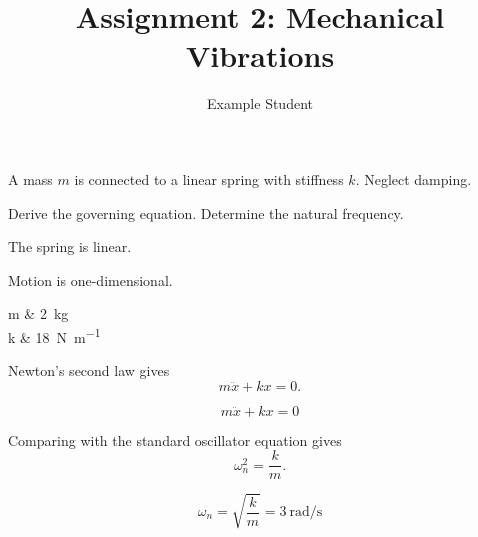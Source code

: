 \documentclass[english,screen,final]{noahassignment}
\title{Assignment 2: Mechanical Vibrations}
\author{Example Student}
\begin{document}
\frontmatter
\maketitle
\tableofcontents

\mainmatter


\begin{problem}\label{prob:oscillator}
A mass \(m\) is connected to a linear spring with stiffness \(k\).
Neglect damping.

\begin{subproblems}
  \subproblem Derive the governing equation.\label{prob:oscillator:equation}
  \subproblem Determine the natural frequency.\label{prob:oscillator:frequency}
\end{subproblems}
\end{problem}

\begin{assumptions}
  \item The spring is linear.
  \item Motion is one-dimensional.
\end{assumptions}

\begin{givens}
  m & \qty{2}{\kilogram} \\
  k & \qty{18}{\newton\per\meter}
\end{givens}

\begin{derivation}
  Newton's second law gives
  \[
    m\ddot{x}+kx=0.
  \]
  \begin{subresult}
    \[
      m\ddot{x}+kx=0
    \]
  \end{subresult}

  Comparing with the standard oscillator equation gives
  \[
    \omega_n^2=\frac{k}{m}.
  \]
  \begin{subresult}
    \[
      \omega_n=\sqrt{\frac{k}{m}}=\qty{3}{\radian\per\second}
    \]
  \end{subresult}
\end{derivation}
\end{document}
